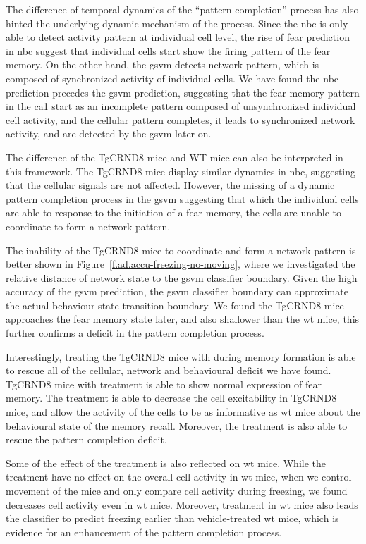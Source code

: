 The difference of temporal dynamics of the ``pattern completion'' process has also hinted the underlying dynamic mechanism of the process. Since the \gls{nbc} is only able to detect activity pattern at individual cell level, the rise of fear prediction in \gls{nbc} suggest that individual cells start show the firing pattern of the fear memory. On the other hand, the \gls{gsvm} detects network pattern, which is composed of synchronized activity of individual cells. We have found the \gls{nbc} prediction precedes the \gls{gsvm} prediction, suggesting that the fear memory pattern in the \gls{ca1} start as an incomplete pattern composed of unsynchronized individual cell activity, and the cellular pattern completes, it leads to synchronized network activity, and are detected by the \gls{gsvm} later on. 

The difference of the TgCRND8 mice and WT mice can also be interpreted in this framework. The TgCRND8 mice display similar dynamics in \gls{nbc}, suggesting that the cellular signals are not affected. However, the missing of a dynamic pattern completion process in the \gls{gsvm} suggesting that which the individual cells are able to response to the initiation of a fear memory, the cells are unable to coordinate to form a network pattern. 

The inability of the TgCRND8 mice to coordinate and form a network pattern is better shown in Figure~\ref{f.ad.accu-freezing-no-moving}, where we investigated the relative distance of network state to the \gls{gsvm} classifier boundary. Given the high accuracy of the \gls{gsvm} prediction, the \gls{gsvm} classifier boundary can approximate the actual behaviour state transition boundary. We found the TgCRND8 mice approaches the fear memory state later, and also shallower than the \gls{wt} mice, this further confirms a deficit in the pattern completion process. 

Interestingly, treating the TgCRND8 mice with \tglu{} during memory formation is able to rescue all of the cellular, network and behavioural deficit we have found. TgCRND8 mice with \tglu{} treatment is able to show normal expression of fear memory. The \tglu{} treatment is able to decrease the cell excitability in TgCRND8 mice, and allow the activity of the cells to be as informative as \gls{wt} mice about the behavioural state of the memory recall. Moreover, the \tglu{} treatment is also able to rescue the pattern completion deficit. 

Some of the effect of the \tglu{} treatment is also reflected on \gls{wt} mice. While the \tglu{} treatment have no effect on the overall cell activity in \gls{wt} mice, when we control movement of the mice and only compare cell activity during freezing, we found \tglu{} decreases cell activity even in \gls{wt} mice. Moreover, \tglu{} treatment in \gls{wt} mice also leads the classifier to predict freezing earlier than vehicle-treated \gls{wt} mice, which is evidence for an enhancement of the pattern completion process. 

